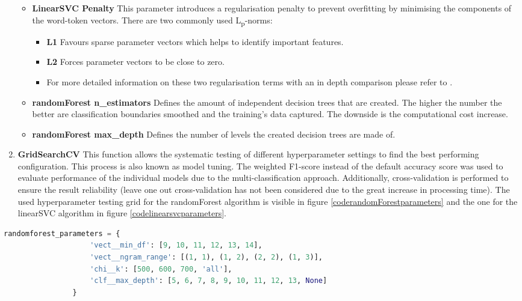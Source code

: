 \begin{enumerate}
\begin{itemize}[label={}]
        \item \textbf{LinearSVC Penalty} This parameter introduces a regularisation penalty to prevent overfitting by minimising the components of the word-token vectors. There are two commonly used L\textsubscript{p}-norms:
        \begin{itemize}[label={}]
            \item \textbf{L1} Favours sparse parameter vectors which helps to identify important features.
            \item \textbf{L2} Forces parameter vectors to be close to zero.
            \item For more detailed information on these two regularisation terms with an in depth comparison please refer to \parencite{Mazilu2011}.
        \end{itemize}
        
        \item \textbf{randomForest n\_estimators} Defines the amount of independent decision trees that are created. The higher the number the better are classification boundaries smoothed and the training's data captured. The downside is the computational cost increase.
        
        \item \textbf{randomForest max\_depth} Defines the number of levels the created decision trees are made of.
    \end{itemize}
    
    \item \textbf{GridSearchCV} This function allows the systematic testing of different hyperparameter settings to find the best performing configuration. This process is also known as model tuning. The weighted F1-score instead of the default accuracy score was used to evaluate performance of the individual models due to the multi-classification approach. Additionally, cross-validation is performed to ensure the result reliability (leave one out cross-validation has not been considered due to the great increase in processing time). The used hyperparameter testing grid for the randomForest algorithm is visible in figure \ref{coderandomForestparameters} and the one for the linearSVC algorithm in figure \ref{codelinearsvcparameters}.
\end{enumerate}

\begin{lstlisting}[language=Python, caption=Tuned hyperparameters of the randomForest fitting algorithm, label=coderandomForestparameters]
randomforest_parameters = {
                    'vect__min_df': [9, 10, 11, 12, 13, 14],
                    'vect__ngram_range': [(1, 1), (1, 2), (2, 2), (1, 3)],
                    'chi__k': [500, 600, 700, 'all'],
                    'clf__max_depth': [5, 6, 7, 8, 9, 10, 11, 12, 13, None]
                }
\end{lstlisting}

